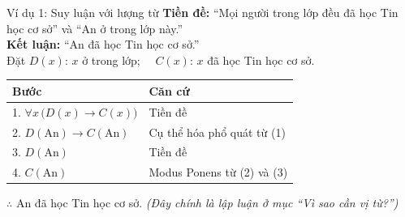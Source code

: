 \documentclass[12pt,a4paper]{article}
\begin{document}
\begin{baitap}{Ví dụ 1: Suy luận với lượng từ}
\textbf{Tiền đề:} ``Mọi người trong lớp đều đã học Tin học cơ sở'' và ``An ở trong lớp này.''\\
\textbf{Kết luận:} ``An đã học Tin học cơ sở.''\\
Đặt $D(x)$: $x$ ở trong lớp; $\quad C(x)$: $x$ đã học Tin học cơ sở.

\vspace{3pt}
\begin{center}
\renewcommand{\arraystretch}{1.2}
\begin{tabular}{ll}
\toprule
\textbf{Bước} & \textbf{Căn cứ} \\
\midrule
1. $\forall x\,\big(D(x) \to C(x)\big)$ & \textcolor{PrimaryBlue}{Tiền đề} \\
2. $D(\text{An}) \to C(\text{An})$ & \textcolor{PrimaryBlue}{Cụ thể hóa phổ quát từ (1)} \\
3. $D(\text{An})$ & \textcolor{PrimaryBlue}{Tiền đề} \\
4. \textcolor{AccentRed}{$C(\text{An})$} & \textcolor{PrimaryBlue}{Modus Ponens từ (2) và (3)} \\
\bottomrule
\end{tabular}
\end{center}
\vspace{2pt}
$\therefore$ An đã học Tin học cơ sở. \textit{(Đây chính là lập luận ở mục ``Vì sao cần vị từ?'')}
\end{baitap}
\end{document}
